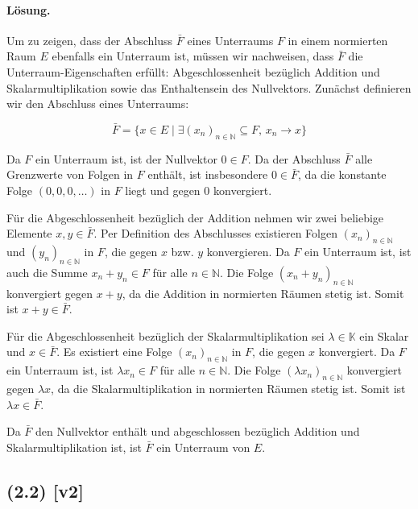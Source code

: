 \documentclass[11pt,a4paper]{article}
\begin{document}
\paragraph{Lösung.}
Um zu zeigen, dass der Abschluss $\bar{F}$ eines Unterraums $F$ in einem normierten Raum $E$ ebenfalls ein Unterraum ist, müssen wir nachweisen, dass $\bar{F}$ die Unterraum-Eigenschaften erfüllt: Abgeschlossenheit bezüglich Addition und Skalarmultiplikation sowie das Enthaltensein des Nullvektors. Zunächst definieren wir den Abschluss eines Unterraums:

\begin{equation*}
\bar{F} = \{ x \in E \mid \exists (x_n)_{n \in \mathbb{N}} \subseteq F, \, x_n \to x \}
\end{equation*}

Da $F$ ein Unterraum ist, ist der Nullvektor $0 \in F$. Da der Abschluss $\bar{F}$ alle Grenzwerte von Folgen in $F$ enthält, ist insbesondere $0 \in \bar{F}$, da die konstante Folge $(0, 0, 0, \ldots)$ in $F$ liegt und gegen $0$ konvergiert.

Für die Abgeschlossenheit bezüglich der Addition nehmen wir zwei beliebige Elemente $x, y \in \bar{F}$. Per Definition des Abschlusses existieren Folgen $(x_n)_{n \in \mathbb{N}}$ und $(y_n)_{n \in \mathbb{N}}$ in $F$, die gegen $x$ bzw. $y$ konvergieren. Da $F$ ein Unterraum ist, ist auch die Summe $x_n + y_n \in F$ für alle $n \in \mathbb{N}$. Die Folge $(x_n + y_n)_{n \in \mathbb{N}}$ konvergiert gegen $x + y$, da die Addition in normierten Räumen stetig ist. Somit ist $x + y \in \bar{F}$.

Für die Abgeschlossenheit bezüglich der Skalarmultiplikation sei $\lambda \in \mathbb{K}$ ein Skalar und $x \in \bar{F}$. Es existiert eine Folge $(x_n)_{n \in \mathbb{N}}$ in $F$, die gegen $x$ konvergiert. Da $F$ ein Unterraum ist, ist $\lambda x_n \in F$ für alle $n \in \mathbb{N}$. Die Folge $(\lambda x_n)_{n \in \mathbb{N}}$ konvergiert gegen $\lambda x$, da die Skalarmultiplikation in normierten Räumen stetig ist. Somit ist $\lambda x \in \bar{F}$.

Da $\bar{F}$ den Nullvektor enthält und abgeschlossen bezüglich Addition und Skalarmultiplikation ist, ist $\bar{F}$ ein Unterraum von $E$.


\subsection*{(2.2) [v2]}
\end{document}
